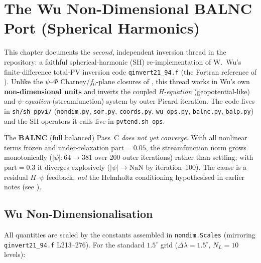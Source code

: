 \chapter{The Wu Non-Dimensional BALNC Port (Spherical Harmonics)}
\label{chap:wu_balnc}

This chapter documents the \emph{second}, independent inversion thread
in the repository: a faithful spherical-harmonic (SH) re-implementation
of W.~Wu's finite-difference total-PV inversion code
\texttt{qinvert21\_94.f} (the Fortran reference of
).  Unlike the $\psi$--$\Phi$
Charney/$f_0$-plane closures of , this thread
works in Wu's own \textbf{non-dimensional units} and inverts the coupled
\emph{H-equation} (geopotential-like) and \emph{$\psi$-equation}
(streamfunction) system by outer Picard iteration.  The code lives in
\texttt{sh/sh\_ppvi/} (\texttt{nondim.py}, \texttt{sor.py},
\texttt{coords.py}, \texttt{wu\_ops.py}, \texttt{balnc.py},
\texttt{balp.py}) and the SH operators it calls live in
\texttt{pvtend.sh\_ops}.

\begin{keybox}
The \textbf{BALNC} (full balanced) Pass~C \emph{does not yet converge}.
With all nonlinear terms frozen and under-relaxation
$\mathrm{part}=0.05$, the streamfunction norm grows monotonically
($|\psi|\!:64\!\to\!381$ over 200 outer iterations) rather than
settling; with $\mathrm{part}=0.3$ it diverges explosively
($|\psi|\!\to\!\mathrm{NaN}$ by iteration~100).  The cause is a residual
$H$--$\psi$ feedback, \emph{not} the Helmholtz conditioning hypothesised
in earlier notes (see ).
\end{keybox}

\section{Wu Non-Dimensionalisation}
\label{sec:wu_nondim}

All quantities are scaled by the constants assembled in
\texttt{nondim.Scales} (mirroring \texttt{qinvert21\_94.f} L213--276).
For the standard $1.5^\circ$ grid ($\Delta\lambda=1.5^\circ$, $N_L=10$
levels):

